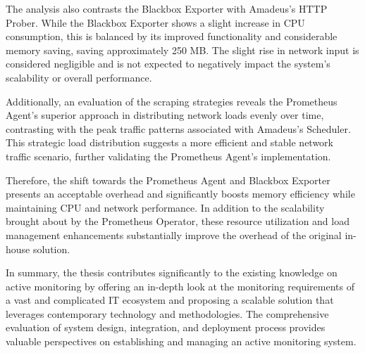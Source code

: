 The analysis also contrasts the Blackbox Exporter with Amadeus's \ac{HTTP} Prober. While the Blackbox Exporter shows a slight increase in \ac{CPU} consumption, this is balanced by its improved functionality and considerable memory saving, saving approximately 250 MB. The slight rise in network input is considered negligible and is not expected to negatively impact the system's scalability or overall performance. 

Additionally, an evaluation of the scraping strategies reveals the Prometheus Agent's superior approach in distributing network loads evenly over time, contrasting with the peak traffic patterns associated with Amadeus's Scheduler. This strategic load distribution suggests a more efficient and stable network traffic scenario, further validating the Prometheus Agent's implementation. 

Therefore, the shift towards the Prometheus Agent and Blackbox Exporter presents an acceptable overhead and significantly boosts memory efficiency while maintaining \ac{CPU} and network performance. In addition to the scalability brought about by the Prometheus Operator, these resource utilization and load management enhancements substantially improve the overhead of the original in-house solution. 

In summary, the thesis contributes significantly to the existing knowledge on active monitoring by offering an in-depth look at the monitoring requirements of a vast and complicated IT ecosystem and proposing a scalable solution that leverages contemporary technology and methodologies. The comprehensive evaluation of system design, integration, and deployment process provides valuable perspectives on establishing and managing an active monitoring system. 